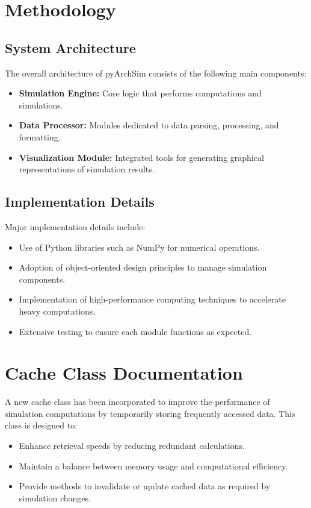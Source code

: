 \documentclass[12pt,a4paper]{report}
\begin{document}
\section{Methodology}
\subsection{System Architecture}
The overall architecture of pyArchSim consists of the following main components:
\begin{itemize}
  \item \textbf{Simulation Engine:} Core logic that performs computations and simulations.
  \item \textbf{Data Processor:} Modules dedicated to data parsing, processing, and formatting.
  \item \textbf{Visualization Module:} Integrated tools for generating graphical representations of simulation results.
\end{itemize}

\subsection{Implementation Details}
Major implementation details include:
\begin{itemize}
  \item Use of Python libraries such as NumPy for numerical operations.
  \item Adoption of object-oriented design principles to manage simulation components.
  \item Implementation of high-performance computing techniques to accelerate heavy computations.
  \item Extensive testing to ensure each module functions as expected.
\end{itemize}

\section{Cache Class Documentation}
A new cache class\cite{pyarchsim_mohammed} has been incorporated to improve the performance of simulation computations by temporarily storing frequently accessed data. This class is designed to:
\begin{itemize}
  \item Enhance retrieval speeds by reducing redundant calculations.
  \item Maintain a balance between memory usage and computational efficiency.
  \item Provide methods to invalidate or update cached data as required by simulation changes.
\end{itemize}
\end{document}
